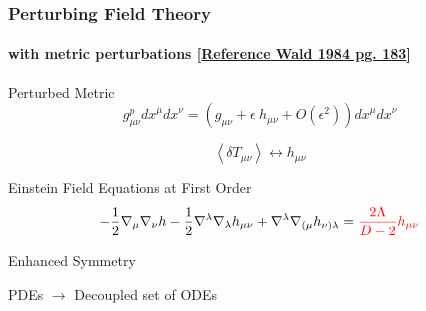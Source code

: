 \documentclass[aspectratio=169, xcolor=dvipsnames]{beamer}
\begin{document}
\begin{frame}
  \frametitle{Perturbing Field Theory}
  \framesubtitle{with metric perturbations [\href{https://inspirehep.net/literature/209356}{Reference Wald 1984 pg. 183}]}

  \begin{block}{Perturbed Metric}
    \begin{equation*}
      g^{p}_{\mu\nu} {dx}^\mu {dx}^\nu = \left(g_{\mu\nu}+\epsilon~h_{\mu\nu}+O(\epsilon^2)\right) {dx}^\mu {dx}^\nu
    \end{equation*}

    \begin{equation*}
      \left\langle \delta T_{\mu\nu}\right\rangle\longleftrightarrow h_{\mu\nu}
    \end{equation*}
  \end{block}

  \begin{block}{Einstein Field Equations at First Order}
    \begin{equation*}
      -\frac{1}{2}\nabla_\mu \nabla_\nu h-\frac{1}{2}\nabla^\lambda \nabla_\lambda h_{\mu\nu}+\nabla^\lambda \nabla_{(\mu}h_{\nu)\lambda} = \textcolor{red}{\frac{2\Lambda}{D-2}h_{\mu\nu}}
    \end{equation*}
  \end{block}


  \begin{block}{Enhanced Symmetry}
    \begin{center}PDEs $\rightarrow$ Decoupled set of ODEs\end{center}
  \end{block}

\end{frame}
\end{document}

